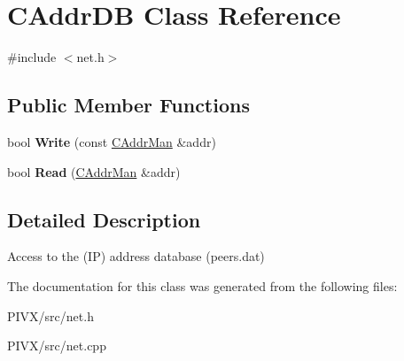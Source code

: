 \hypertarget{class_c_addr_d_b}{}\section{C\+Addr\+DB Class Reference}
\label{class_c_addr_d_b}


{\ttfamily \#include $<$net.\+h$>$}

\subsection*{Public Member Functions}
\begin{DoxyCompactItemize}
\item 
\mbox{\label{class_c_addr_d_b_aaec90dba59cd69a2f25bc5630a1dde39}} 
bool {\bfseries Write} (const \mbox{\hyperlink{class_c_addr_man}{C\+Addr\+Man}} \&addr)
\item 
\mbox{\label{class_c_addr_d_b_aed4b567fb7c2dd15b2856e7c769967b7}} 
bool {\bfseries Read} (\mbox{\hyperlink{class_c_addr_man}{C\+Addr\+Man}} \&addr)
\end{DoxyCompactItemize}


\subsection{Detailed Description}
Access to the (IP) address database (peers.\+dat) 

The documentation for this class was generated from the following files\+:\begin{DoxyCompactItemize}
\item 
P\+I\+V\+X/src/net.\+h\item 
P\+I\+V\+X/src/net.\+cpp\end{DoxyCompactItemize}
